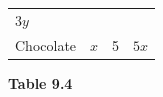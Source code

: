 {\begin{mdframed}[linewidth=4, leftmargin=40, rightmargin=40]
\begin{exercise}
\begin{enumerate}[noitemsep, label=\textbf{Step} \textbf{\arabic*}. ]
{{\begin{center}
\begin{tabular}[t]{|l|l|l|l|}
                  \begin{math}3y\end{math}
     \tabularnewline\cline{1-1}\cline{2-2}\cline{3-3}\cline{4-4}
    
    
        Chocolate &
    
    
        
                  \begin{math}x\end{math}
                 &
    
    
        5 &
    
    
        
                  \begin{math}5x\end{math}
     \tabularnewline\cline{1-1}\cline{2-2}\cline{3-3}\cline{4-4}
    \end{tabular}
      \end{center}
    \begin{center}{\small\bfseries Table 9.4}\end{center}
    
    \addtocounter{footnote}{-0}
    
          }{ %
        
    
}}
\end{enumerate}
\end{exercise}
\end{mdframed}}
